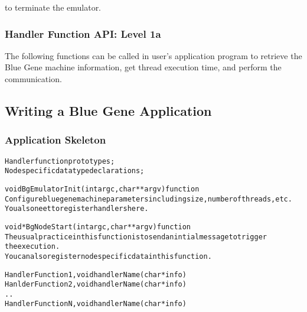 
to terminate the emulator.

\subsubsection{Handler Function API: Level 1a}

The following functions can be called in user's application program to retrieve
the Blue Gene machine information, get thread execution time, and perform
the communication.








\subsection{Writing a Blue Gene Application}

\subsubsection{Application Skeleton}

\begin{alltt}
Handler function prototypes;
Node specific data type declarations;

void  BgEmulatorInit(int argc, char **argv)  function
  Configure bluegene machine parameters including size, number of threads, etc.
  You also neet to register handlers here.

void *BgNodeStart(int argc, char **argv) function
  The usual practice in this function is to send an intial message to trigger 
  the execution.
  You can also register node specific data in this function.

Handler Function 1, void handlerName(char *info)
Hanlder Function 2, void handlerName(char *info)
..
Handler Function N, void handlerName(char *info)

\end{alltt}

